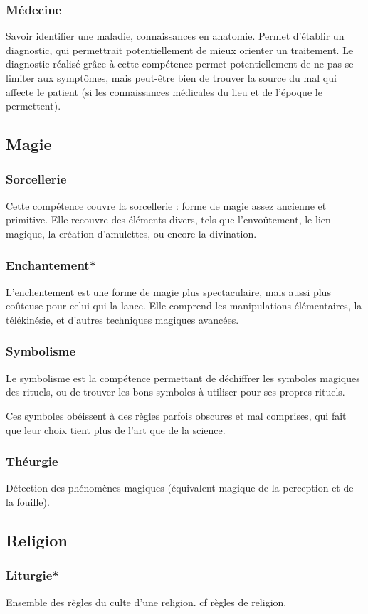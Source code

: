 \documentclass[10pt,a4paper,twocolumn]{book}
\begin{document}
\subsubsection{Médecine}
Savoir identifier une maladie, connaissances en anatomie. Permet d'établir un diagnostic, qui permettrait potentiellement de mieux orienter un traitement. Le diagnostic réalisé grâce à cette compétence permet potentiellement de ne pas se limiter aux symptômes, mais peut-être bien de trouver la source du mal qui affecte le patient (si les connaissances médicales du lieu et de l'époque le permettent).
\subsection{Magie}
\subsubsection{Sorcellerie}
Cette compétence couvre la sorcellerie : forme de magie assez ancienne et primitive. Elle recouvre des éléments divers, tels que l'envoûtement, le lien magique, la création d'amulettes, ou encore la divination.
\subsubsection{Enchantement*}
L'enchentement est une forme de magie plus spectaculaire, mais aussi plus coûteuse pour celui qui la lance. Elle comprend les manipulations élémentaires, la télékinésie, et d'autres techniques magiques avancées.
\subsubsection{Symbolisme}
Le symbolisme est la compétence permettant de déchiffrer les symboles magiques des rituels, ou de trouver les bons symboles à utiliser pour ses propres rituels.

Ces symboles obéissent à des règles parfois obscures et mal comprises, qui fait que leur choix tient plus de l'art que de la science.
\subsubsection{Théurgie}
Détection des phénomènes magiques (équivalent magique de la perception et de la fouille).
\subsection{Religion}
\subsubsection{Liturgie*}
Ensemble des règles du culte d’une religion. cf règles de religion.
\end{document}

